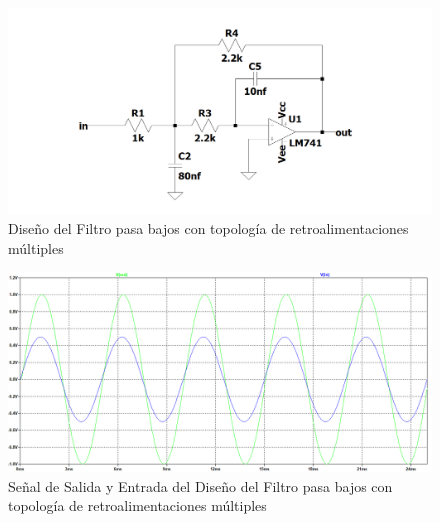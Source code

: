 \begin{enumerate}
\begin{itemize}
                \begin{figure}[H]
                      \centering
                      \setcounter{figure}{31}
                      \includegraphics[width=15cm]{Imagenes/sim_retro_circuito.png}
                      \caption{Diseño del Filtro pasa bajos con topología de retroalimentaciones múltiples}
                      \label{fig:sim_retro_circuito}
                \end{figure}

                \begin{figure}[H]
                      \centering
                      \renewcommand{\figurename}{Gráfica}
                      \setcounter{figure}{12}
                      \includegraphics[width=15cm]{Imagenes/sim_sallen_key_vo.png}
                      \caption{Señal de Salida y Entrada del Diseño del Filtro pasa bajos con topología de retroalimentaciones múltiples}
                      \label{fig:sim_retro_vo}
                \end{figure}


\end{itemize}
\end{enumerate}
